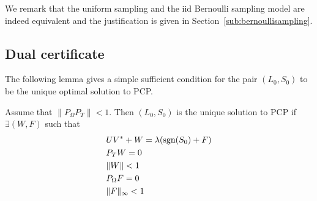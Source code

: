 We remark that the uniform sampling and the iid Bernoulli sampling model are indeed equivalent and the justification is given in Section~\ref{sub:bernoullisampling}.
\subsection{Dual certificate}
The following lemma gives a simple sufficient condition for the pair $(L_0,S_0)$ to be the unique optimal solution to PCP.

\begin{lemma}
Assume that $\|P_\Omega P_T \| < 1$. Then $(L_0,S_0)$ is the unique solution to PCP if $\exists (W, F)$ such that
\begin{equation}
\begin{aligned}
& UV^* + W = \lambda(\text{sgn}(S_0) + F) \\
& P_T W = 0 \\
& \|W\|<1 \\
& P_\Omega F = 0 \\
& \|F\|_\infty < 1
\end{aligned}
\end{equation}

\end{lemma}


